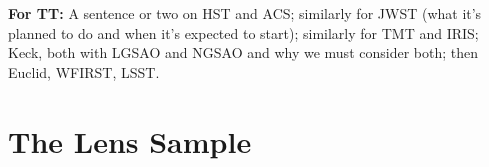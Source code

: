 \documentclass[a4paper,11pt]{article}
\begin{document}
\textbf{For TT:} A sentence or two on HST and ACS; similarly for JWST (what it's planned to do and when it's expected to start); similarly for TMT and IRIS; Keck, both with LGSAO and NGSAO and why we must consider both; then Euclid, WFIRST, LSST.




\section{The Lens Sample}
\end{document}
